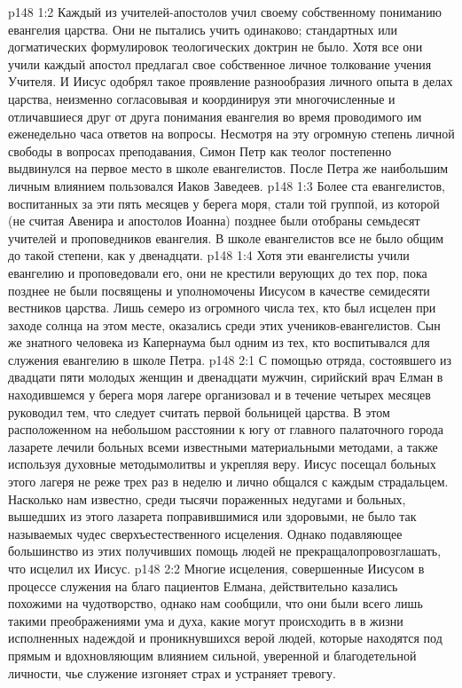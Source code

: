 \vs p148 1:2 Каждый из учителей\hyp{}апостолов учил своему собственному пониманию евангелия царства. Они не пытались учить одинаково; стандартных или догматических формулировок теологических доктрин не было. Хотя все они учили  каждый апостол предлагал свое собственное личное толкование учения Учителя. И Иисус одобрял такое проявление разнообразия личного опыта в делах царства, неизменно согласовывая и координируя эти многочисленные и отличавшиеся друг от друга понимания евангелия во время проводимого им еженедельно часа ответов на вопросы. Несмотря на эту огромную степень личной свободы в вопросах преподавания, Симон Петр как теолог постепенно выдвинулся на первое место в школе евангелистов. После Петра же наибольшим личным влиянием пользовался Иаков Заведеев.
\vs p148 1:3 Более ста евангелистов, воспитанных за эти пять месяцев у берега моря, стали той группой, из которой (не считая Авенира и апостолов Иоанна) позднее были отобраны семьдесят учителей и проповедников евангелия. В школе евангелистов все не было общим до такой степени, как у двенадцати.
\vs p148 1:4 Хотя эти евангелисты учили евангелию и проповедовали его, они не крестили верующих до тех пор, пока позднее не были посвящены и уполномочены Иисусом в качестве семидесяти вестников царства. Лишь семеро из огромного числа тех, кто был исцелен при заходе солнца на этом месте, оказались среди этих учеников\hyp{}евангелистов. Сын же знатного человека из Капернаума был одним из тех, кто воспитывался для служения евангелию в школе Петра.
\vs p148 2:1 С помощью отряда, состоявшего из двадцати пяти молодых женщин и двенадцати мужчин, сирийский врач Елман в находившемся у берега моря лагере организовал и в течение четырех месяцев руководил тем, что следует считать первой больницей царства. В этом расположенном на небольшом расстоянии к югу от главного палаточного города лазарете лечили больных всеми известными материальными методами, а также используя духовные методымолитвы и укрепляя веру. Иисус посещал больных этого лагеря не реже трех раз в неделю и лично общался с каждым страдальцем. Насколько нам известно, среди тысячи пораженных недугами и больных, вышедших из этого лазарета поправившимися или здоровыми, не было так называемых чудес сверхъестественного исцеления. Однако подавляющее большинство из этих получивших помощь людей не прекращалопровозглашать, что исцелил их Иисус.
\vs p148 2:2 Многие исцеления, совершенные Иисусом в процессе служения на благо пациентов Елмана, действительно казались похожими на чудотворство, однако нам сообщили, что они были всего лишь такими преображениями ума и духа, какие могут происходить в в жизни исполненных надеждой и проникнувшихся верой людей, которые находятся под прямым и вдохновляющим влиянием сильной, уверенной и благодетельной личности, чье служение изгоняет страх и устраняет тревогу.
